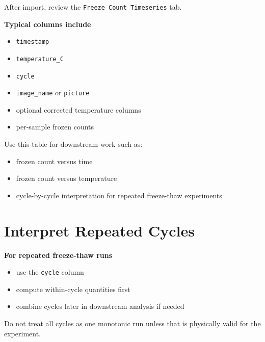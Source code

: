 \documentclass[
  9pt,
  letterpaper,
  oneside,
  open=any,
  DIV=15,
  parskip=half-,
  headings=big,
  numbers=noenddot
]{scrbook}
\newcommand{\manuallead}[1]{%
  \vspace{0.15em}%
  {\sffamily\bfseries\color{ManualBlue}#1}\par\nobreak\vspace{0.05em}%
}
\begin{document}
After import, review the \texttt{Freeze Count Timeseries} tab.


\manuallead{Typical columns include}

\begin{itemize}[leftmargin=*,itemsep=0.35em,topsep=0.4em]
\item \texttt{timestamp}
\item \texttt{temperature\_C}
\item \texttt{cycle}
\item \texttt{image\_name} or \texttt{picture}
\item optional corrected temperature columns
\item per-sample frozen counts
\end{itemize}

Use this table for downstream work such as:


\begin{itemize}[leftmargin=*,itemsep=0.35em,topsep=0.4em]
\item frozen count versus time
\item frozen count versus temperature
\item cycle-by-cycle interpretation for repeated freeze-thaw experiments
\end{itemize}

\section{Interpret Repeated Cycles}

\manuallead{For repeated freeze-thaw runs}

\begin{itemize}[leftmargin=*,itemsep=0.35em,topsep=0.4em]
\item use the \texttt{cycle} column
\item compute within-cycle quantities first
\item combine cycles later in downstream analysis if needed
\end{itemize}

Do not treat all cycles as one monotonic run unless that is physically valid for the experiment.
\end{document}
